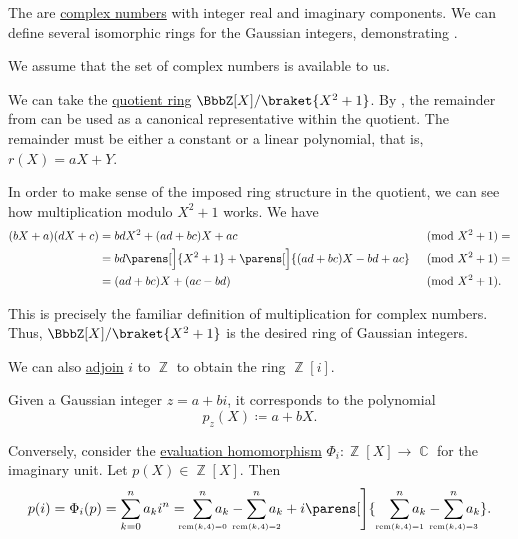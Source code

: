 \begin{example}\label{ex:gaussian_integers}
  The  are \hyperref[def:complex_numbers]{complex numbers} with integer real and imaginary components. We can define several isomorphic rings for the Gaussian integers, demonstrating .

  We assume that the set of complex numbers is available to us.

  \begin{thmenum}
     We can take the \hyperref[def:ring/quotient]{quotient ring} \( \BbbZ[X] / \braket{X^2 + 1} \). By , the remainder from  can be used as a canonical representative within the quotient. The remainder must be either a constant or a linear polynomial, that is, \( r(X) = aX + Y \).

    In order to make sense of the imposed ring structure in the quotient, we can see how multiplication modulo \( X^2 + 1 \) works. We have
    \begin{align*}
      (bX + a) (dX + c)
      &=
      bdX^2 + (ad + bc)X + ac
      &\pmod {X^2 + 1} = \\ &=
      bd\parens[\Big]{ X^2 + 1 } + \parens[\Big]{ (ad + bc)X - bd + ac }
      &\pmod {X^2 + 1} = \\ &=
      (ad + bc)X + (ac - bd)
      &\pmod {X^2 + 1}. \phantom{=}
    \end{align*}

    This is precisely the familiar definition of multiplication for complex numbers. Thus, \( \BbbZ[X] / \braket{X^2 + 1} \) is the desired ring of Gaussian integers.

     We can also \hyperref[thm:adjoining_elements_to_semiring]{adjoin} \( i \) to \( \BbbZ \) to obtain the ring \( \BbbZ[i] \).

    Given a Gaussian integer \( z = a + bi \), it corresponds to the polynomial
    \begin{equation*}
      p_z(X) \coloneqq a + bX.
    \end{equation*}

    Conversely, consider the \hyperref[thm:polynomial_algebra_universal_property]{evaluation homomorphism} \( \Phi_i: \BbbZ[X] \to \BbbC \) for the imaginary unit. Let \( p(X) \in \BbbZ[X] \). Then
    \begin{equation*}
      p(i)
      =
      \Phi_i(p)
      =
      \sum_{k=0}^n a_k i^n
      =
      \thickspace \sum_{\scriptscriptstyle{\mathclap{\rem(k, 4) = 0}}}^n a_k - \sum_{\scriptscriptstyle{\mathclap{\rem(k, 4) = 2}}}^n a_k + i \parens[\Bigg]{ \quad \sum_{\scriptscriptstyle{\mathclap{\rem(k, 4) = 1}}}^n a_k - \sum_{\scriptscriptstyle{\mathclap{\rem(k, 4) = 3}}}^n a_k }.
    \end{equation*}


\end{thmenum}
\end{example}
